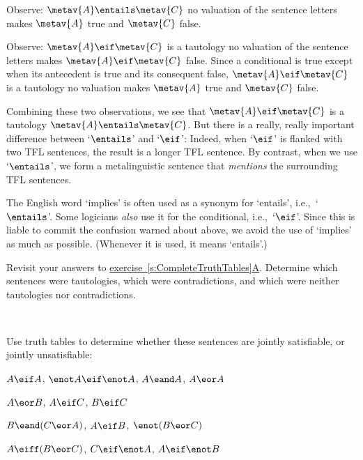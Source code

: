 Observe: $\metav{A} \entails \metav{C}$ \ifeff{} no valuation of the sentence letters makes $\metav{A}$ true and $\metav{C}$ false.

Observe: $\metav{A} \eif \metav{C}$ is a tautology \ifeff{} no valuation of the sentence letters makes $\metav{A} \eif \metav{C}$ false. Since a conditional is true except when its antecedent is true and its consequent false, $\metav{A} \eif \metav{C}$ is a tautology \ifeff{} no valuation makes $\metav{A}$ true and $\metav{C}$ false.

Combining these two observations, we see that $\metav{A} \eif \metav{C}$  is a tautology \ifeff{}  $\metav{A} \entails \metav{C}$. But there is a really, really important difference between `$\entails$' and `$\eif$':
Indeed, when `$\eif$' is flanked with two TFL sentences, the result is a longer TFL sentence. By contrast, when we use `$\entails$', we form a metalinguistic sentence that \emph{mentions} the surrounding TFL sentences.

The English word `implies' is often used as a synonym for `entails',
i.e.,~`$\entails$'. Some logicians \emph{also} use it for the
conditional, i.e.,~`$\eif$'. Since this is liable to commit the
confusion warned about above, we avoid the use of `implies' as much as
possible. (Whenever it is used, it means `entails'.)


\practiceproblems
\problempart
Revisit your answers to
\hyperref[pr.TT.TTorC]{exercise~\ref*{s:CompleteTruthTables}A}. Determine which
sentences were tautologies, which were contradictions, and which were
neither tautologies nor contradictions.
\solutions

\

\problempart
\label{pr.TT.satisfiable}
Use truth tables to determine whether these sentences are jointly satisfiable, or jointly unsatisfiable:
\begin{compactlist}
\item $A\eif A$, $\enot A \eif \enot A$, $A\eand A$, $A\eor A$ %
\item $A\eor B$, $A\eif C$, $B\eif C$ %
\item $B\eand(C\eor A)$, $A\eif B$, $\enot(B\eor C)$  %
\item $A\eiff(B\eor C)$, $C\eif \enot A$, $A\eif \enot B$ %
\end{compactlist}


